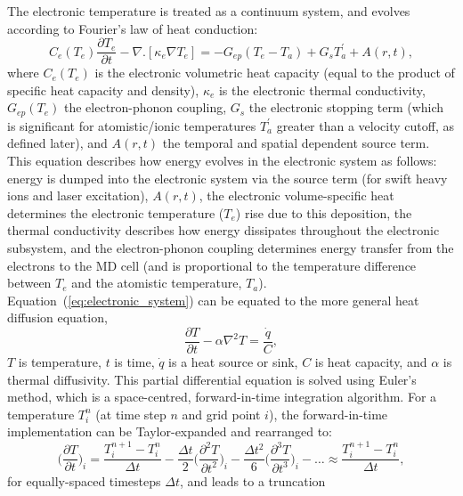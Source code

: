 The electronic temperature is treated as a continuum system, and evolves
according to Fourier's law of heat conduction:
\begin{equation} \label{eq:electronic_system}
C_e(T_e) \frac{\partial T_e}{\partial t} - \nabla . [\kappa_e \nabla T_e ] = -G_{ep}(T_e - T_a) + G_s T^{\prime}_a + A(r,t),
\end{equation}
where $C_e(T_e)$ is the electronic volumetric heat capacity (equal to the
product of specific heat capacity and density), $\kappa_e$ is the
electronic thermal conductivity, $G_{ep}(T_e)$ the electron-phonon
coupling, $G_s$ the electronic stopping term (which is significant for
atomistic/ionic temperatures $T^{\prime}_a$ greater than a velocity cutoff,
as defined later), and $A(r,t)$ the temporal and spatial dependent source term.
This equation describes how energy evolves in the electronic system as follows:
energy is dumped into the electronic system via the source term (for swift heavy
ions and laser excitation), $A(r,t)$, the electronic volume-specific heat
determines the electronic temperature ($T_e$) rise due to this deposition,
the thermal conductivity describes how energy dissipates throughout the
electronic subsystem, and the electron-phonon coupling determines
energy transfer from the electrons to the MD cell (and is proportional to
the temperature difference between $T_e$ and the atomistic temperature,
$T_a$). Equation~(\ref{eq:electronic_system}) can be equated to the
more general heat diffusion equation,
\begin{equation} \label{eq:heatdiffusion}
\frac{\partial T}{\partial t} - \alpha \nabla^2 T = \frac{\dot{q}}{C},
\end{equation}
$T$ is temperature, $t$ is time, $\dot{q}$ is a heat source or sink,
$C$ is heat capacity, and $\alpha$ is thermal diffusivity. This partial
differential equation is solved using Euler's method, which is a
space-centred, forward-in-time integration algorithm. For a
temperature $T_{i}^{n}$ (at time step $n$ and grid point $i$), the
forward-in-time implementation can be Taylor-expanded and
rearranged to:
\begin{equation}
\bigg(\frac{\partial T}{\partial t}\bigg)_i = \frac{T_{i}^{n+1} - T_{i}^{n}}{\Delta t} - \frac{\Delta t}{2}\bigg(\frac{\partial^2 T}{\partial t^2}\bigg)_i  - \frac{\Delta t^2}{6}\bigg(\frac{\partial^3 T}{\partial t^3}\bigg)_i - \dots \approx \frac{T_{i}^{n+1} - T_{i}^{n}}{\Delta t} ,
\end{equation}
for equally-spaced timesteps $\Delta t$, and leads to a truncation
